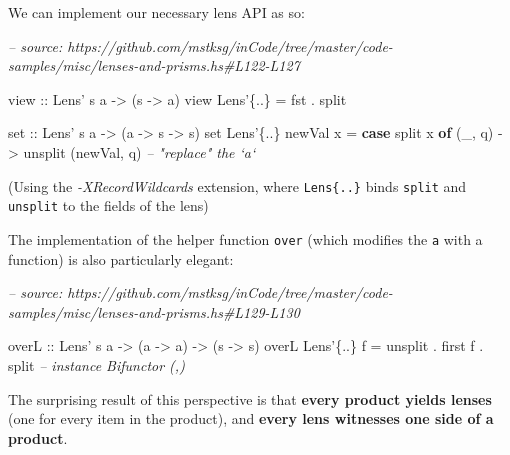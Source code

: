 \documentclass[]{article}
\newenvironment{Shaded}{}{}
\newcommand{\CommentTok}[1]{\textcolor[rgb]{0.38,0.63,0.69}{\textit{#1}}}
\newcommand{\DataTypeTok}[1]{\textcolor[rgb]{0.56,0.13,0.00}{#1}}
\newcommand{\FunctionTok}[1]{\textcolor[rgb]{0.02,0.16,0.49}{#1}}
\newcommand{\KeywordTok}[1]{\textcolor[rgb]{0.00,0.44,0.13}{\textbf{#1}}}
\newcommand{\NormalTok}[1]{#1}
\newcommand{\OtherTok}[1]{\textcolor[rgb]{0.00,0.44,0.13}{#1}}
\begin{document}
We can implement our necessary lens API as so:

\begin{Shaded}
\begin{Highlighting}[]
\CommentTok{-- source: https://github.com/mstksg/inCode/tree/master/code-samples/misc/lenses-and-prisms.hs#L122-L127}

\OtherTok{view ::} \DataTypeTok{Lens'}\NormalTok{ s a }\OtherTok{->}\NormalTok{ (s }\OtherTok{->}\NormalTok{ a)}
\NormalTok{view }\DataTypeTok{Lens'}\NormalTok{\{}\FunctionTok{..}\NormalTok{\} }\FunctionTok{=} \FunctionTok{fst} \FunctionTok{.}\NormalTok{ split}

\OtherTok{set ::} \DataTypeTok{Lens'}\NormalTok{ s a }\OtherTok{->}\NormalTok{ (a }\OtherTok{->}\NormalTok{ s }\OtherTok{->}\NormalTok{ s)}
\NormalTok{set }\DataTypeTok{Lens'}\NormalTok{\{}\FunctionTok{..}\NormalTok{\} newVal x }\FunctionTok{=} \KeywordTok{case}\NormalTok{ split x }\KeywordTok{of}
\NormalTok{    (_, q) }\OtherTok{->}\NormalTok{ unsplit (newVal, q)      }\CommentTok{-- "replace" the `a`}
\end{Highlighting}
\end{Shaded}

(Using the \emph{-XRecordWildcards} extension, where
\texttt{Lens\textquotesingle{}\{..\}} binds \texttt{split} and \texttt{unsplit}
to the fields of the lens)

The implementation of the helper function \texttt{over} (which modifies the
\texttt{a} with a function) is also particularly elegant:

\begin{Shaded}
\begin{Highlighting}[]
\CommentTok{-- source: https://github.com/mstksg/inCode/tree/master/code-samples/misc/lenses-and-prisms.hs#L129-L130}

\OtherTok{overL ::} \DataTypeTok{Lens'}\NormalTok{ s a }\OtherTok{->}\NormalTok{ (a }\OtherTok{->}\NormalTok{ a) }\OtherTok{->}\NormalTok{ (s }\OtherTok{->}\NormalTok{ s)}
\NormalTok{overL }\DataTypeTok{Lens'}\NormalTok{\{}\FunctionTok{..}\NormalTok{\}  f }\FunctionTok{=}\NormalTok{ unsplit }\FunctionTok{.}\NormalTok{ first f }\FunctionTok{.}\NormalTok{ split   }\CommentTok{-- instance Bifunctor (,)}
\end{Highlighting}
\end{Shaded}

The surprising result of this perspective is that \textbf{every product yields
lenses} (one for every item in the product), and \textbf{every lens witnesses
one side of a product}.
\end{document}
